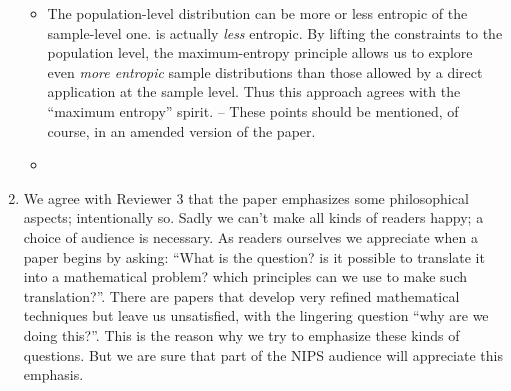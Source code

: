 \documentclass{article}
\begin{document}
\begin{enumerate}
\begin{itemize}
  \item The population-level distribution can be more or less entropic of
    the sample-level one. is actually \emph{less} entropic. By
    lifting the constraints to the population level, the maximum-entropy
    principle allows us to explore even \emph{more entropic} sample
    distributions than those allowed by a direct application at the sample
    level. Thus this approach agrees with the \enquote{maximum entropy}
    spirit. -- These points should be mentioned, of course, in an amended
    version of the paper.
  \item 
  \end{itemize}
\item We agree with Reviewer 3 that the paper emphasizes some philosophical
  aspects; intentionally so. Sadly we can't make all kinds of readers
  happy; a choice of audience is necessary. As readers ourselves we
  appreciate when a paper begins by asking: \enquote{What is the question?
    is it possible to translate it into a mathematical problem? which
    principles can we use to make such translation?}. There are papers that
  develop very refined mathematical techniques but leave us unsatisfied,
  with the lingering question \enquote{why are we doing this?}. This is the
  reason why we try to emphasize these kinds of questions. But we are sure
  that part of the NIPS audience will appreciate this emphasis.


\end{enumerate}
\end{document}

